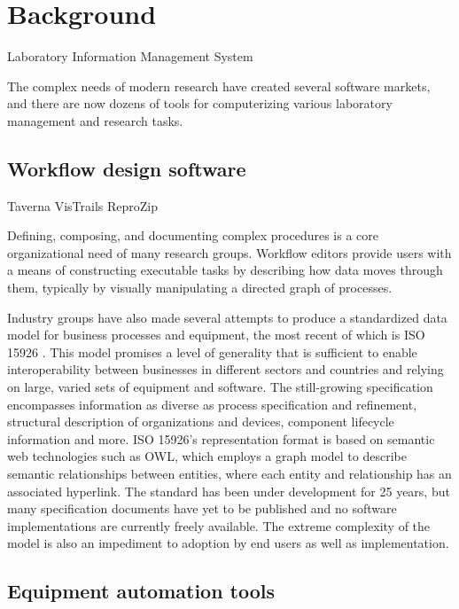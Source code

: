 \chapter{Background}



Laboratory Information Management System



The complex needs of modern research have created several software
markets, and there are now dozens of tools for computerizing various
laboratory management and research tasks.

\section{Workflow design software}

Taverna
VisTrails
ReproZip

Defining, composing, and documenting complex procedures is a core
organizational need of many research groups. Workflow editors provide
users with a means of constructing executable tasks by describing how
data moves through them, typically by visually manipulating a directed
graph of processes.

Industry groups have also made several attempts to produce a
standardized data model for business processes and equipment, the
most recent of which is ISO 15926 \cite{West2009}. This model promises
a level of generality that is sufficient to enable interoperability
between businesses in different sectors and countries and relying on
large, varied sets of equipment and software. The still-growing
specification encompasses information as diverse as process
specification and refinement, structural description of organizations
and devices, component lifecycle information and more. ISO 15926's
representation format is based on semantic web technologies such as OWL, which
employs a graph model to describe semantic relationships between
entities, where each entity and relationship has an associated
hyperlink. The standard has been under development for 25 years, but
many specification documents have yet to be published and no software
implementations are currently freely available. The extreme complexity
of the model is also an impediment to adoption by end users as well as
implementation.

\section{Equipment automation tools}

